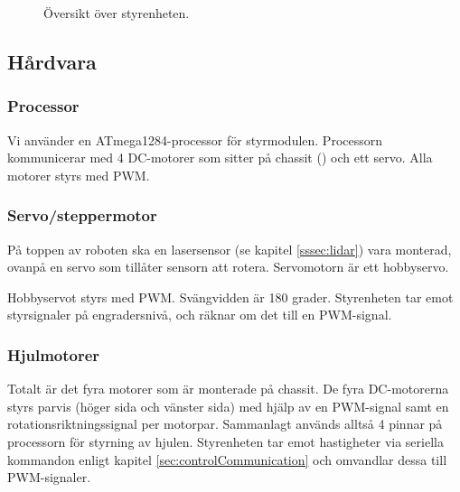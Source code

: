 \documentclass[a4paper,11pt]{article}
\begin{document}
\begin{figure}[h!]
    \caption{Översikt över styrenheten.}
    \label{fig:unitMotorcontroller}
\end{figure}

\subsection{Hårdvara}

\subsubsection{Processor}
Vi använder en ATmega1284-processor för styrmodulen. Processorn kommunicerar med 4 DC-motorer som sitter på chassit (\cite{terminator}) och ett servo. Alla motorer styrs med PWM.

\clearpage

\subsubsection{Servo/steppermotor} \label{ssec:servomotor}
På toppen av roboten ska en lasersensor (se kapitel \ref{sssec:lidar}) vara monterad, ovanpå en servo som tillåter sensorn att rotera. Servomotorn är ett hobbyservo.

Hobbyservot styrs med PWM. Svängvidden är 180 grader. Styrenheten tar emot styrsignaler på engradersnivå, och räknar om det till en PWM-signal.


\subsubsection{Hjulmotorer}
Totalt är det fyra motorer som är monterade på chassit. De fyra DC-motorerna styrs parvis (höger sida och vänster sida) med hjälp av en PWM-signal samt en rotationsriktningssignal per motorpar. Sammanlagt används alltså 4 pinnar på processorn för styrning av hjulen. Styrenheten tar emot hastigheter via seriella kommandon enligt kapitel \ref{sec:controlCommunication} och omvandlar dessa till PWM-signaler.
\end{document}
